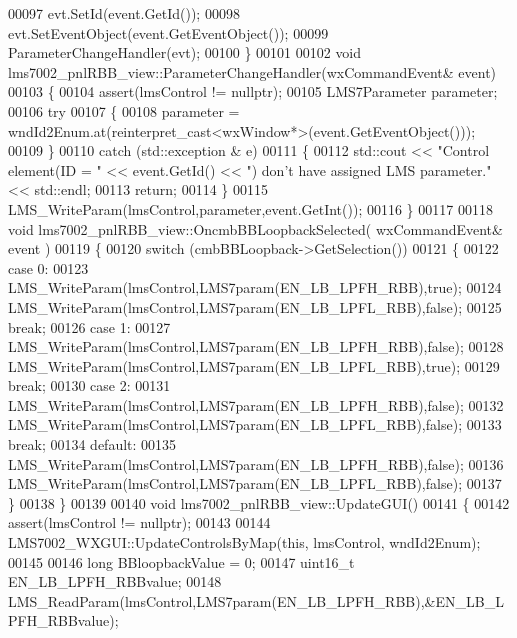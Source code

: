 \begin{DoxyCode}
{{{00097     evt.SetId(event.GetId());
00098     evt.SetEventObject(event.GetEventObject());
00099     ParameterChangeHandler(evt);
00100 \}
00101 
00102 \textcolor{keywordtype}{void} lms7002_pnlRBB_view::ParameterChangeHandler(wxCommandEvent& event)
00103 \{
00104     assert(lmsControl != \textcolor{keyword}{nullptr});
00105     LMS7Parameter parameter;
00106     \textcolor{keywordflow}{try}
00107     \{
00108         parameter = wndId2Enum.at(reinterpret\_cast<wxWindow*>(event.GetEventObject()));
00109     \}
00110     \textcolor{keywordflow}{catch} (std::exception & e)
00111     \{
00112         std::cout << \textcolor{stringliteral}{"Control element(ID = "} << \textcolor{keyword}{event}.GetId() << \textcolor{stringliteral}{") don't have assigned LMS parameter."} << 
      std::endl;
00113         \textcolor{keywordflow}{return};
00114     \}
00115     LMS_WriteParam(lmsControl,parameter,event.GetInt());
00116 \}
00117 
00118 \textcolor{keywordtype}{void} lms7002_pnlRBB_view::OncmbBBLoopbackSelected( wxCommandEvent& event )
00119 \{
00120     \textcolor{keywordflow}{switch} (cmbBBLoopback->GetSelection())
00121     \{
00122     \textcolor{keywordflow}{case} 0:
00123         LMS_WriteParam(lmsControl,LMS7param(EN_LB_LPFH_RBB),\textcolor{keyword}{true});
00124         LMS_WriteParam(lmsControl,LMS7param(EN_LB_LPFL_RBB),\textcolor{keyword}{false});
00125         \textcolor{keywordflow}{break};
00126     \textcolor{keywordflow}{case} 1:
00127         LMS_WriteParam(lmsControl,LMS7param(EN_LB_LPFH_RBB),\textcolor{keyword}{false});
00128         LMS_WriteParam(lmsControl,LMS7param(EN_LB_LPFL_RBB),\textcolor{keyword}{true});
00129         \textcolor{keywordflow}{break};
00130     \textcolor{keywordflow}{case} 2:
00131         LMS_WriteParam(lmsControl,LMS7param(EN_LB_LPFH_RBB),\textcolor{keyword}{false});
00132         LMS_WriteParam(lmsControl,LMS7param(EN_LB_LPFL_RBB),\textcolor{keyword}{false});
00133         \textcolor{keywordflow}{break};
00134     \textcolor{keywordflow}{default}:
00135         LMS_WriteParam(lmsControl,LMS7param(EN_LB_LPFH_RBB),\textcolor{keyword}{false});
00136         LMS_WriteParam(lmsControl,LMS7param(EN_LB_LPFL_RBB),\textcolor{keyword}{false});
00137     \}
00138 \}
00139 
00140 \textcolor{keywordtype}{void} lms7002_pnlRBB_view::UpdateGUI()
00141 \{
00142     assert(lmsControl != \textcolor{keyword}{nullptr});
00143 
00144     LMS7002_WXGUI::UpdateControlsByMap(\textcolor{keyword}{this}, lmsControl, wndId2Enum);
00145 
00146     \textcolor{keywordtype}{long} BBloopbackValue = 0;
00147     uint16\_t EN\_LB\_LPFH\_RBBvalue;
00148     LMS_ReadParam(lmsControl,LMS7param(EN_LB_LPFH_RBB),&EN\_LB\_LPFH\_RBBvalue);
}}}
\end{DoxyCode}

